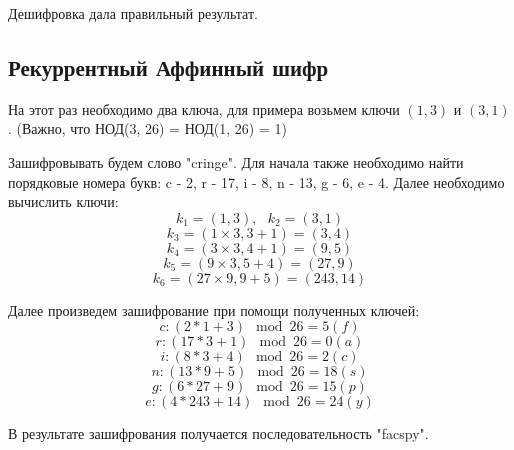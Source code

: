 \documentclass[a4paper]{article}
\begin{document}
  Дешифровка дала правильный результат.

  \subsection{Рекуррентный Аффинный шифр}

  На этот раз необходимо два ключа, для примера возьмем ключи $(1, 3)$ и $(3, 1)$.
  (Важно, что НОД(3, 26) = НОД(1, 26) = 1)

  Зашифровывать будем слово "cringe". Для начала также необходимо найти порядковые номера
  букв: c - 2, r - 17, i - 8, n - 13, g - 6, e - 4. Далее необходимо вычислить ключи:
  \begin{equation}
    k_1 = (1, 3), \:\:\: k_2 = (3, 1)
  \end{equation}
  \begin{equation}
    k_3 = (1 \times 3, 3 + 1) = (3, 4)
  \end{equation}
  \begin{equation}
    k_4 = (3 \times 3, 4 + 1) = (9, 5)
  \end{equation}
  \begin{equation}
    k_5 = (9 \times 3, 5 + 4) = (27, 9)
  \end{equation}
  \begin{equation}
    k_6 = (27 \times 9, 9 + 5) = (243, 14)
  \end{equation}

  Далее произведем зашифрование при помощи полученных ключей:
  \begin{equation}
    c: (2 * 1 + 3) \mod{26} = 5 (f)
  \end{equation}
  \begin{equation}
    r: (17 * 3 + 1) \mod{26} = 0 (a)
  \end{equation}
  \begin{equation}
    i: (8 * 3 + 4) \mod{26} = 2 (c)
  \end{equation}
  \begin{equation}
    n: (13 * 9 + 5) \mod{26} = 18 (s)
  \end{equation}
  \begin{equation}
    g: (6 * 27 + 9) \mod{26} = 15 (p)
  \end{equation}
  \begin{equation}
    e: (4 * 243 + 14) \mod{26} = 24 (y)
  \end{equation}

  В результате зашифрования получается последовательность "facspy".
\end{document}
